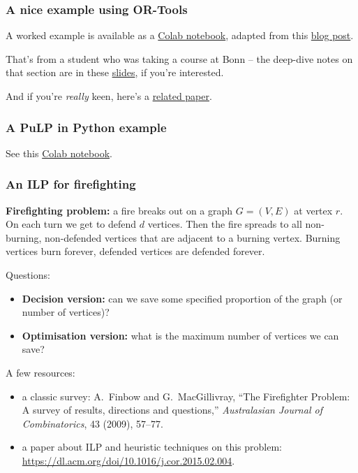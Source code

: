 \documentclass[11pt]{article}
\begin{document}
\subsubsection{A nice example using OR-Tools}

A worked example is available as a \href{https://colab.research.google.com/drive/1Gxt_sBVOZAaUo_LNvz60e1BacJ_azivs?usp=sharing}{Colab notebook}, adapted from this \href{https://phabe.ch/2023/08/07/vertex-coloring-using-ilp/}{blog post}.

That's from a student who was taking a course at Bonn -- the deep-dive notes on that section are in these \href{https://www.or.uni-bonn.de/~held/hausdorff_school_22/slides/GraphColoringFormulations.pdf}{slides}, if you're interested.

And if you're \emph{really} keen, here's a \href{https://arxiv.org/pdf/1706.10191}{related paper}.

\subsubsection{A PuLP in Python example}

See this \href{https://colab.research.google.com/drive/1_PIERNAIiQbVuDekkfdIkLQGtY2-dm4m?usp=sharing}{Colab notebook}.

\subsubsection{An ILP for firefighting}

\textbf{Firefighting problem:} a fire breaks out on a graph $G = (V, E)$ at vertex $r$. On each turn we get to defend $d$ vertices. Then the fire spreads to all non-burning, non-defended vertices that are adjacent to a burning vertex. Burning vertices burn forever, defended vertices are defended forever.

Questions:
\begin{itemize}
    \item \textbf{Decision version:} can we save some specified proportion of the graph (or number of vertices)?
    \item \textbf{Optimisation version:} what is the maximum number of vertices we can save?
\end{itemize}

A few resources:
\begin{itemize}
    \item a classic survey: A.\ Finbow and G.\ MacGillivray, ``The Firefighter Problem: A survey of results, directions and questions,'' \emph{Australasian Journal of Combinatorics}, 43 (2009), 57--77.
    \item a paper about ILP and heuristic techniques on this problem: \url{https://dl.acm.org/doi/10.1016/j.cor.2015.02.004}.
\end{itemize}
\end{document}
